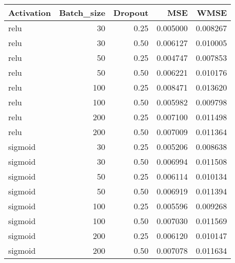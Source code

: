 \begin{tabular}{lrrrr}
\toprule
Activation &  Batch\_size &  Dropout &      MSE &     WMSE \\
\midrule
      relu &          30 &     0.25 & 0.005000 & 0.008267 \\
      relu &          30 &     0.50 & 0.006127 & 0.010005 \\
      relu &          50 &     0.25 & 0.004747 & 0.007853 \\
      relu &          50 &     0.50 & 0.006221 & 0.010176 \\
      relu &         100 &     0.25 & 0.008471 & 0.013620 \\
      relu &         100 &     0.50 & 0.005982 & 0.009798 \\
      relu &         200 &     0.25 & 0.007100 & 0.011498 \\
      relu &         200 &     0.50 & 0.007009 & 0.011364 \\
   sigmoid &          30 &     0.25 & 0.005206 & 0.008638 \\
   sigmoid &          30 &     0.50 & 0.006994 & 0.011508 \\
   sigmoid &          50 &     0.25 & 0.006114 & 0.010134 \\
   sigmoid &          50 &     0.50 & 0.006919 & 0.011394 \\
   sigmoid &         100 &     0.25 & 0.005596 & 0.009268 \\
   sigmoid &         100 &     0.50 & 0.007030 & 0.011569 \\
   sigmoid &         200 &     0.25 & 0.006120 & 0.010147 \\
   sigmoid &         200 &     0.50 & 0.007078 & 0.011634 \\
\bottomrule
\end{tabular}
